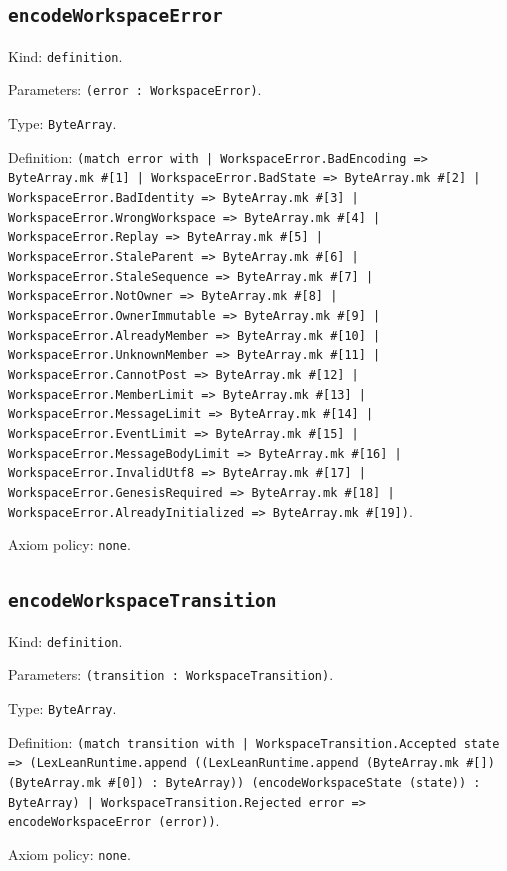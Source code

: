\documentclass[11pt]{article}
\begin{document}
\subsection*{\texttt{encodeWorkspaceError}}
\noindent Kind: \texttt{definition}.\par
\noindent Parameters: \texttt{(error : WorkspaceError)}.\par
\noindent Type: \texttt{ByteArray}.\par
\noindent Definition: \texttt{(match error with | WorkspaceError.BadEncoding => ByteArray.mk \#[1] | WorkspaceError.BadState => ByteArray.mk \#[2] | WorkspaceError.BadIdentity => ByteArray.mk \#[3] | WorkspaceError.WrongWorkspace => ByteArray.mk \#[4] | WorkspaceError.Replay => ByteArray.mk \#[5] | WorkspaceError.StaleParent => ByteArray.mk \#[6] | WorkspaceError.StaleSequence => ByteArray.mk \#[7] | WorkspaceError.NotOwner => ByteArray.mk \#[8] | WorkspaceError.OwnerImmutable => ByteArray.mk \#[9] | WorkspaceError.AlreadyMember => ByteArray.mk \#[10] | WorkspaceError.UnknownMember => ByteArray.mk \#[11] | WorkspaceError.CannotPost => ByteArray.mk \#[12] | WorkspaceError.MemberLimit => ByteArray.mk \#[13] | WorkspaceError.MessageLimit => ByteArray.mk \#[14] | WorkspaceError.EventLimit => ByteArray.mk \#[15] | WorkspaceError.MessageBodyLimit => ByteArray.mk \#[16] | WorkspaceError.InvalidUtf8 => ByteArray.mk \#[17] | WorkspaceError.GenesisRequired => ByteArray.mk \#[18] | WorkspaceError.AlreadyInitialized => ByteArray.mk \#[19])}.\par
\noindent Axiom policy: \texttt{none}.\par
\subsection*{\texttt{encodeWorkspaceTransition}}
\noindent Kind: \texttt{definition}.\par
\noindent Parameters: \texttt{(transition : WorkspaceTransition)}.\par
\noindent Type: \texttt{ByteArray}.\par
\noindent Definition: \texttt{(match transition with | WorkspaceTransition.Accepted state => (LexLeanRuntime.append ((LexLeanRuntime.append (ByteArray.mk \#[]) (ByteArray.mk \#[0]) : ByteArray)) (encodeWorkspaceState (state)) : ByteArray) | WorkspaceTransition.Rejected error => encodeWorkspaceError (error))}.\par
\noindent Axiom policy: \texttt{none}.\par
\end{document}
